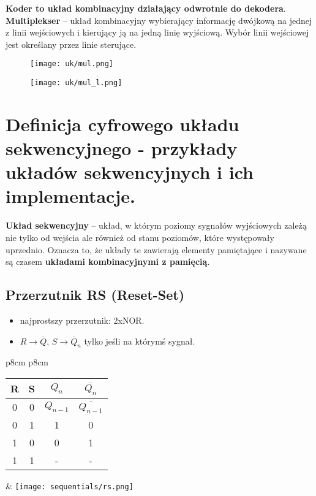 \documentclass[main.tex]{subfiles}
\begin{document}
    \textbf{Koder to układ kombinacyjny działający odwrotnie do dekodera}.
    \hfill \\

    \noindent \textbf{Multiplekser} -- układ kombinacyjny wybierający informację dwójkową na jednej z linii wejściowych i kierujący
    ją na jedną linię wyjściową. Wybór linii wejściowej jest określany przez linie sterujące.

    \begin{figure}[H]
        \texttt{[image: uk/mul.png]}
    \end{figure}

    \begin{figure}[H]
        \texttt{[image: uk/mul\_l.png]}
    \end{figure}


    \section{Definicja cyfrowego układu sekwencyjnego - przykłady układów sekwencyjnych i ich implementacje.}

    \textbf{Układ sekwencyjny} -- układ, w którym poziomy sygnałów wyjściowych zależą nie tylko od wejścia
    ale również od stanu poziomów, które występowały uprzednio.
    Oznacza to, że układy te zawierają elementy pamiętające i nazywane są czasem \textbf{układami kombinacyjnymi z pamięcią}.

    \subsection{Przerzutnik RS (Reset-Set)}
    \begin{itemize}[noitemsep]
        \item najprostszy przerzutnik: 2xNOR.
        \item $R \rightarrow \overline{Q}$, $S \rightarrow \overline Q_n$ tylko jeśli na którymś sygnał.
    \end{itemize}

    \begin{table}[H]
        \center
        \begin{tabular}{p{8cm} p{8cm}}
            \begin{tabular}{|c|c|c|c|}
                \hline
                \textbf{R} & \textbf{S} & $Q_n$ & $\overline{Q_n}$ \\ \hline \hline
                0 & 0 & $Q_{n-1}$ & $\overline{Q_{n-1}}$            \\ \hline
                0 & 1 & 1 & 0              \\ \hline
                1 & 0 & 0 & 1              \\ \hline
                1 & 1 & - & -              \\ \hline
            \end{tabular}
            &
            \texttt{[image: sequentials/rs.png]}
        \end{tabular}
    \end{table}
\end{document}
